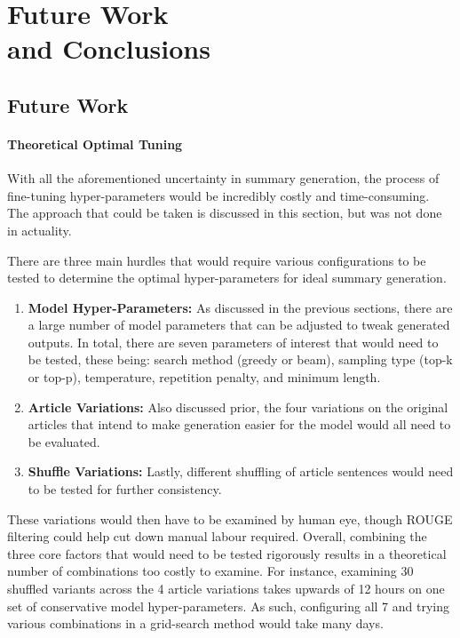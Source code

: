 \documentclass[12pt]{report}
\begin{document}
\newpage





\chapter{Future Work \\and Conclusions}
    \section{Future Work}
    \subsubsection{Theoretical Optimal Tuning}
        With all the aforementioned uncertainty in summary generation, the process of fine-tuning hyper-parameters would be incredibly costly and time-consuming. The approach that could be taken is discussed in this section, but was not done in actuality.
            
        There are three main hurdles that would require various configurations to be tested to determine the optimal hyper-parameters for ideal summary generation.
        
        \begin{enumerate}
            \item \textbf{Model Hyper-Parameters:} As discussed in the previous sections, there are a large number of model parameters that can be adjusted to tweak generated outputs. In total, there are seven parameters of interest that would need to be tested, these being: search method (greedy or beam), sampling type (top-k or top-p), temperature, repetition penalty, and minimum length.
            \item \textbf{Article Variations:} Also discussed prior, the four variations on the original articles that intend to make generation easier for the model would all need to be evaluated.
            \item \textbf{Shuffle Variations:} Lastly, different shuffling of article sentences would need to be tested for further consistency.
        \end{enumerate}
        
        These variations would then have to be examined by human eye, though ROUGE filtering could help cut down manual labour required. Overall, combining the three core factors that would need to be tested rigorously results in a theoretical number of combinations too costly to examine. For instance, examining 30 shuffled variants across the 4 article variations takes upwards of 12 hours on one set of conservative model hyper-parameters. As such, configuring all 7 and trying various combinations in a grid-search method would take many days.
    
\end{document}
